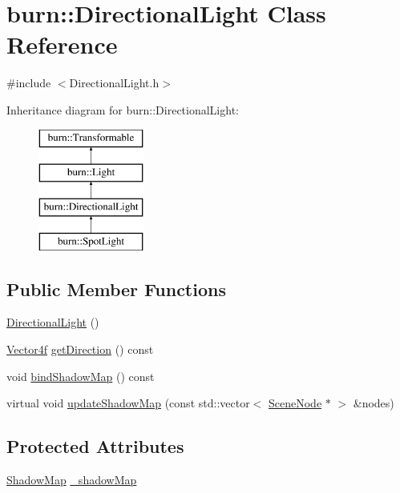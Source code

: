 \hypertarget{classburn_1_1_directional_light}{\section{burn\-:\-:Directional\-Light Class Reference}
\label{classburn_1_1_directional_light}
}


{\ttfamily \#include $<$Directional\-Light.\-h$>$}

Inheritance diagram for burn\-:\-:Directional\-Light\-:\begin{figure}[H]
\begin{center}
\leavevmode
\includegraphics[height=4.000000cm]{classburn_1_1_directional_light}
\end{center}
\end{figure}
\subsection*{Public Member Functions}
\begin{DoxyCompactItemize}
\item 
\hyperlink{classburn_1_1_directional_light_ae3c3bf4a5e7ff1c9d3bf3483216f181c}{Directional\-Light} ()
\item 
\hyperlink{namespaceburn_a58a411b9d83c7970518a9250c1c78068}{Vector4f} \hyperlink{classburn_1_1_directional_light_a3035e2fc3eb45cb08166bec909237ae5}{get\-Direction} () const 
\item 
void \hyperlink{classburn_1_1_directional_light_a33e0b0f6d4cc8c236bf3a690b8e7f356}{bind\-Shadow\-Map} () const 
\item 
virtual void \hyperlink{classburn_1_1_directional_light_a84eb0090ded76e9f73d351ff87a54795}{update\-Shadow\-Map} (const std\-::vector$<$ \hyperlink{classburn_1_1_scene_node}{Scene\-Node} $\ast$ $>$ \&nodes)
\end{DoxyCompactItemize}
\subsection*{Protected Attributes}
\begin{DoxyCompactItemize}
\item 
\hyperlink{classburn_1_1_shadow_map}{Shadow\-Map} \hyperlink{classburn_1_1_directional_light_acbeffa715a9e27537c7521e0218330ff}{\-\_\-shadow\-Map}
\end{DoxyCompactItemize}
